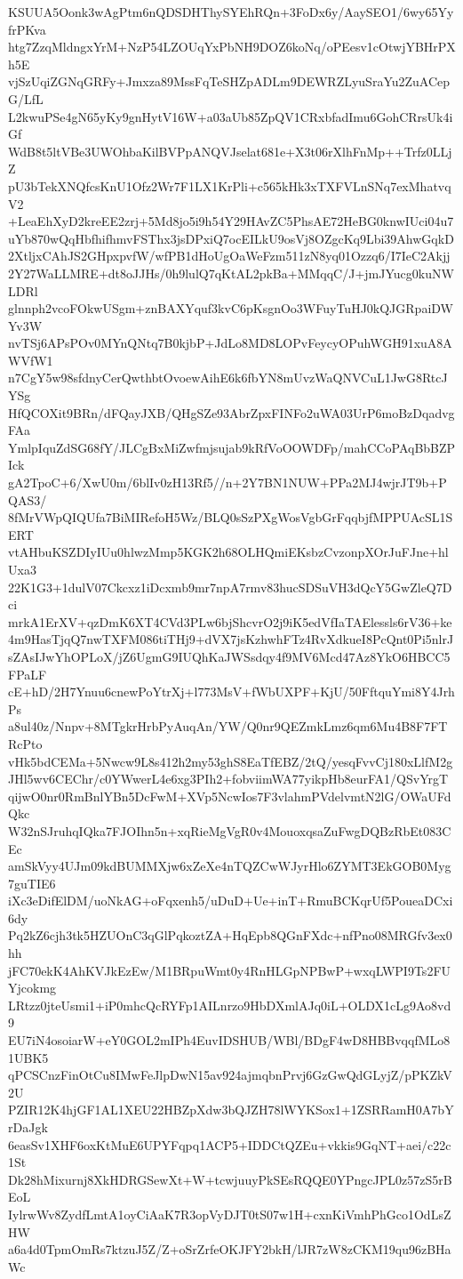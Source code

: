 KSUUA5Oonk3wAgPtm6nQDSDHThySYEhRQn+3FoDx6y/AaySEO1/6wy65YyfrPKva
htg7ZzqMldngxYrM+NzP54LZOUqYxPbNH9DOZ6koNq/oPEesv1cOtwjYBHrPXh5E
vjSzUqiZGNqGRFy+Jmxza89MssFqTeSHZpADLm9DEWRZLyuSraYu2ZuACepG/LfL
L2kwuPSe4gN65yKy9gnHytV16W+a03aUb85ZpQV1CRxbfadImu6GohCRrsUk4iGf
WdB8t5ltVBe3UWOhbaKilBVPpANQVJselat681e+X3t06rXlhFnMp++Trfz0LLjZ
pU3bTekXNQfcsKnU1Ofz2Wr7F1LX1KrPli+c565kHk3xTXFVLnSNq7exMhatvqV2
+LeaEhXyD2kreEE2zrj+5Md8jo5i9h54Y29HAvZC5PhsAE72HeBG0knwIUci04u7
uYb870wQqHbfhifhmvFSThx3jsDPxiQ7ocEILkU9osVj8OZgcKq9Lbi39AhwGqkD
2XtljxCAhJS2GHpxpvfW/wfPB1dHoUgOaWeFzm511zN8yq01Ozzq6/I7IeC2Akjj
2Y27WaLLMRE+dt8oJJHs/0h9lulQ7qKtAL2pkBa+MMqqC/J+jmJYucg0kuNWLDRl
glnnph2vcoFOkwUSgm+znBAXYquf3kvC6pKsgnOo3WFuyTuHJ0kQJGRpaiDWYv3W
nvTSj6APsPOv0MYnQNtq7B0kjbP+JdLo8MD8LOPvFeycyOPuhWGH91xuA8AWVfW1
n7CgY5w98sfdnyCerQwthbtOvoewAihE6k6fbYN8mUvzWaQNVCuL1JwG8RtcJYSg
HfQCOXit9BRn/dFQayJXB/QHgSZe93AbrZpxFINFo2uWA03UrP6moBzDqadvgFAa
YmlpIquZdSG68fY/JLCgBxMiZwfmjsujab9kRfVoOOWDFp/mahCCoPAqBbBZPIck
gA2TpoC+6/XwU0m/6blIv0zH13Rf5//n+2Y7BN1NUW+PPa2MJ4wjrJT9b+PQAS3/
8fMrVWpQIQUfa7BiMIRefoH5Wz/BLQ0sSzPXgWosVgbGrFqqbjfMPPUAcSL1SERT
vtAHbuKSZDIyIUu0hlwzMmp5KGK2h68OLHQmiEKsbzCvzonpXOrJuFJne+hlUxa3
22K1G3+1dulV07Ckcxz1iDcxmb9mr7npA7rmv83hucSDSuVH3dQcY5GwZleQ7Dci
mrkA1ErXV+qzDmK6XT4CVd3PLw6bjShcvrO2j9iK5edVfIaTAElessls6rV36+ke
4m9HasTjqQ7nwTXFM086tiTHj9+dVX7jsKzhwhFTz4RvXdkueI8PcQnt0Pi5nlrJ
sZAsIJwYhOPLoX/jZ6UgmG9IUQhKaJWSsdqy4f9MV6Mcd47Az8YkO6HBCC5FPaLF
cE+hD/2H7Ynuu6cnewPoYtrXj+l773MsV+fWbUXPF+KjU/50FftquYmi8Y4JrhPs
a8ul40z/Nnpv+8MTgkrHrbPyAuqAn/YW/Q0nr9QEZmkLmz6qm6Mu4B8F7FTRcPto
vHk5bdCEMa+5Nwcw9L8s412h2my53ghS8EaTfEBZ/2tQ/yesqFvvCj180xLlfM2g
JHl5wv6CEChr/c0YWwerL4e6xg3PIh2+fobviimWA77yikpHb8eurFA1/QSvYrgT
qijwO0nr0RmBnlYBn5DcFwM+XVp5NcwIos7F3vlahmPVdelvmtN2lG/OWaUFdQkc
W32nSJruhqIQka7FJOIhn5n+xqRieMgVgR0v4MouoxqsaZuFwgDQBzRbEt083CEc
amSkVyy4UJm09kdBUMMXjw6xZeXe4nTQZCwWJyrHlo6ZYMT3EkGOB0Myg7guTIE6
iXc3eDifElDM/uoNkAG+oFqxenh5/uDuD+Ue+inT+RmuBCKqrUf5PoueaDCxi6dy
Pq2kZ6cjh3tk5HZUOnC3qGlPqkoztZA+HqEpb8QGnFXdc+nfPno08MRGfv3ex0hh
jFC70ekK4AhKVJkEzEw/M1BRpuWmt0y4RnHLGpNPBwP+wxqLWPI9Ts2FUYjcokmg
LRtzz0jteUsmi1+iP0mhcQcRYFp1AILnrzo9HbDXmlAJq0iL+OLDX1cLg9Ao8vd9
EU7iN4osoiarW+eY0GOL2mIPh4EuvIDSHUB/WBl/BDgF4wD8HBBvqqfMLo81UBK5
qPCSCnzFinOtCu8IMwFeJlpDwN15av924ajmqbnPrvj6GzGwQdGLyjZ/pPKZkV2U
PZIR12K4hjGF1AL1XEU22HBZpXdw3bQJZH78lWYKSox1+1ZSRRamH0A7bYrDaJgk
6easSv1XHF6oxKtMuE6UPYFqpq1ACP5+IDDCtQZEu+vkkis9GqNT+aei/c22c1St
Dk28hMixurnj8XkHDRGSewXt+W+tcwjuuyPkSEsRQQE0YPngcJPL0z57zS5rBEoL
IylrwWv8ZydfLmtA1oyCiAaK7R3opVyDJT0tS07w1H+cxnKiVmhPhGco1OdLsZHW
a6a4d0TpmOmRs7ktzuJ5Z/Z+oSrZrfeOKJFY2bkH/lJR7zW8zCKM19qu96zBHaWc

